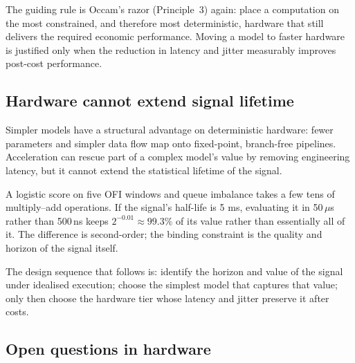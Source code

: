 The guiding rule is Occam's razor (Principle~3) again: place a computation on the most constrained, and
therefore most deterministic, hardware that still delivers the required economic performance.
Moving a model to faster hardware is justified only when the reduction in latency and jitter
measurably improves post-cost performance.

\subsection{Hardware cannot extend signal lifetime}

Simpler models have a structural advantage on deterministic hardware: fewer parameters and
simpler data flow map onto fixed-point, branch-free pipelines. Acceleration can rescue part of a
complex model's value by removing engineering latency, but it cannot extend the statistical
lifetime of the signal.

\begin{example}
A logistic score on five OFI windows and queue imbalance takes a few tens of multiply--add
operations. If the signal's half-life is 5 ms, evaluating it in 50\,$\mu$s rather than 500\,ns
keeps $2^{-0.01} \approx 99.3\%$ of its value rather than essentially all of it. The difference is
second-order; the binding constraint is the quality and horizon of the signal itself.
\end{example}

The design sequence that follows is: identify the horizon and value of the signal under idealised
execution; choose the simplest model that captures that value; only then choose the hardware tier
whose latency and jitter preserve it after costs.

\subsection{Open questions in hardware}

